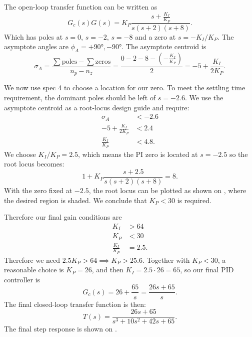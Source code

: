 \begin{exa}
  The open-loop transfer function can be written as
  \begin{equation*}
    G_c(s) G(s) = K_P \frac{s + \frac{K_I}{K_P}}{s(s+2)(s+8)}
  .\end{equation*}
  Which has poles at $s = 0$, $s = -2$, $s=-8$ and a zero at $s = - K_I / K_P$.
  The asymptote angles are $\phi_A = +\ang{90}, -\ang{90}$. 
  The asymptote centroid is
  \begin{equation*}
    \sigma_A = \frac{\sum \text{poles} - \sum \text{zeros}}{n_p - n_z} = \frac{0-2-8- \left( - \frac{K_I}{K_P} \right)}{2} = -5 + \frac{K_I}{2K_P}
  .\end{equation*}
  
  We now use spec 4 to choose a location for our zero.
  To meet the settling time requirement, the dominant poles should be left of $s = - \num{2,6}$.
  We use the asymptote centroid as a root-locus design guide and require:
  \begin{align*}
    \sigma_A &< -\num{2,6} \\
    -5 + \frac{K_I}{2K_P} &< \num{2,4} \\
    \frac{K_I}{K_P} &< \num{4,8} 
  .\end{align*}
  We choose $K_I / K_P = \num{2,5}$, which means the PI zero is located at $s = - \num{2,5}$ so the root locus becomes:
  \begin{equation*}
    1 + K_P \frac{s + \num{2,5} }{s(s+2)(s+8)} = 8
  .\end{equation*}
  With the zero fixed at $-\num{2,5}$, the root locus can be plotted as shown on , where the desired region is shaded.
  We conclude that $K_P < 30$ is required.

  Therefore our final gain conditions are
  \begin{align*}
    K_I &> 64 \\
    K_P &< 30 \\
    \frac{K_I}{K_P} &= \num{2,5}
  .\end{align*}
  Therefore we need $\num{2,5} K_P > 64 \implies K_P > \num{25,6}$. 
  Together with $K_P < 30$, a reasonable choice is $K_P = 26$, and then $K_I = \num{2,5} \cdot 26 = 65$, so our final PID controller is
  \begin{equation*}
    G_c(s) = 26 + \frac{65}{s} = \frac{26s + 65}{s}
  .\end{equation*}
  The final closed-loop transfer function is then:
  \begin{equation*}
    T(s) = \frac{26s + 65}{s^3 + 10s^2 + 42 s + 65}
  .\end{equation*}
  The final step response is shown on .
\end{exa}

